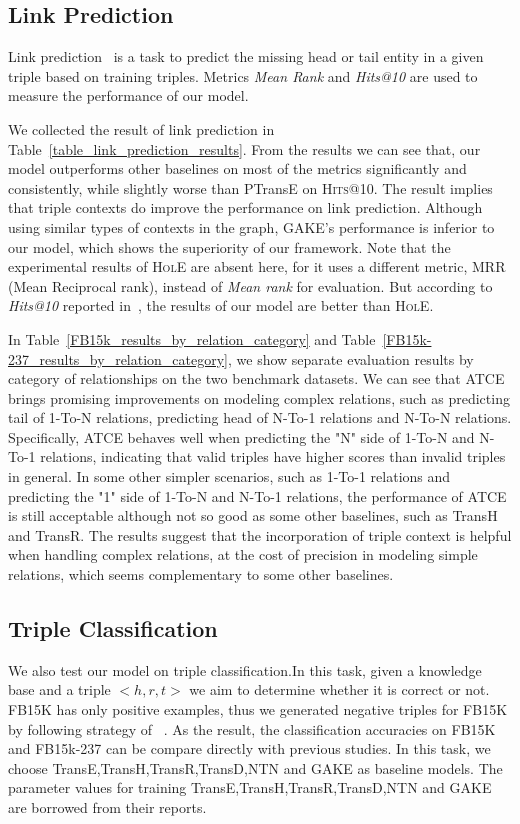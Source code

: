 \subsection{Link Prediction}
Link prediction~\cite{BordesUGWY13} is a task to predict the missing head or tail entity in a given triple based on training triples. Metrics \textit{Mean Rank} and \textit{Hits@10} are used to measure the performance of our model.


We collected the result of link prediction in Table~\ref{table_link_prediction_results}. From the results we can see that, our model outperforms other baselines on most of the metrics significantly and consistently, while slightly worse than PTransE on \textsc{Hits}@10. The result implies that triple contexts do improve the performance on link prediction. Although using similar types of contexts in the graph, GAKE's performance is inferior to our model, which shows the superiority of our framework. Note that the experimental results of \textsc{HolE} are absent here, for it uses a different metric, MRR (Mean Reciprocal rank), instead of \textit{Mean rank} for evaluation. But according to \textit{Hits@10} reported in~\cite{NickelRP16}, the results of our model are better than \textsc{HolE}.


In Table~\ref{FB15k_results_by_relation_category} and Table~\ref{FB15k-237_results_by_relation_category}, we show separate evaluation results by category of relationships on the two benchmark datasets. We can see that ATCE brings promising improvements on modeling complex relations, such as predicting tail of 1-To-N relations, predicting head of N-To-1 relations and N-To-N relations. Specifically, ATCE behaves well when predicting the "N" side of 1-To-N and N-To-1 relations, indicating that valid triples have higher scores than invalid triples in general. In some other simpler scenarios, such as 1-To-1 relations and predicting the "1" side of 1-To-N and N-To-1 relations, the performance of ATCE is still acceptable although not so good as some other baselines, such as TransH and TransR. The results suggest that the incorporation of triple context is helpful when handling complex relations, at the cost of precision in modeling simple relations, which seems complementary to some other baselines.
\subsection{Triple Classification}
We also test our model on triple classification.In this task, given a knowledge base and a triple $<h,r,t>$ we aim to determine whether it is correct or not. FB15K has only positive examples, thus we generated negative triples for FB15K by following strategy of ~\cite{SocherCMN13}. As the result, the classification accuracies on FB15K and FB15k-237 can be compare directly with previous studies. In this task, we choose TransE,TransH,TransR,TransD,NTN and GAKE as baseline models. The parameter values for training TransE,TransH,TransR,TransD,NTN and GAKE are borrowed from their reports.

